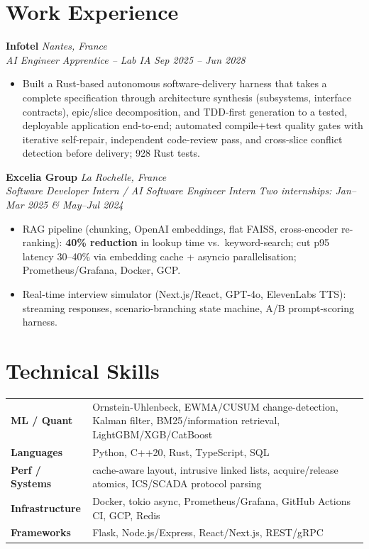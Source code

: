 \documentclass[10pt]{article}
\newcommand{\entry}[4]{%
  \noindent\textbf{#1} \hfill \textit{#2} \\
  \textit{#3} \hfill \textit{#4}\\[-0.3em]
}
\begin{document}
\section*{Work Experience}
\entry{Infotel}{Nantes, France}{AI Engineer Apprentice -- Lab IA}{Sep 2025 -- Jun 2028}
\begin{itemize}
  \item Built a Rust-based autonomous software-delivery harness that takes a complete specification through architecture synthesis (subsystems, interface contracts), epic/slice decomposition, and TDD-first generation to a tested, deployable application end-to-end; automated compile+test quality gates with iterative self-repair, independent code-review pass, and cross-slice conflict detection before delivery; 928 Rust tests.
\end{itemize}
\entry{Excelia Group}{La Rochelle, France}{Software Developer Intern / AI Software Engineer Intern}{Two internships: Jan--Mar 2025 \& May--Jul 2024}
\begin{itemize}
  \item RAG pipeline (chunking, OpenAI embeddings, flat FAISS, cross-encoder re-ranking): \textbf{40\% reduction} in lookup time vs.\ keyword-search; cut p95 latency 30--40\% via embedding cache + asyncio parallelisation; Prometheus/Grafana, Docker, GCP.
  \item Real-time interview simulator (Next.js/React, GPT-4o, ElevenLabs TTS): streaming responses, scenario-branching state machine, A/B prompt-scoring harness.
\end{itemize}

\section*{Technical Skills}
\noindent
\begin{tabular}{@{}p{2.7cm}p{15.5cm}@{}}
\textbf{ML / Quant} & Ornstein-Uhlenbeck, EWMA/CUSUM change-detection, Kalman filter, BM25/information retrieval, LightGBM/XGB/CatBoost \\
\textbf{Languages} & Python, C++20, Rust, TypeScript, SQL \\
\textbf{Perf / Systems} & cache-aware layout, intrusive linked lists, acquire/release atomics, ICS/SCADA protocol parsing \\
\textbf{Infrastructure} & Docker, tokio async, Prometheus/Grafana, GitHub Actions CI, GCP, Redis \\
\textbf{Frameworks} & Flask, Node.js/Express, React/Next.js, REST/gRPC \\
\end{tabular}
\end{document}

